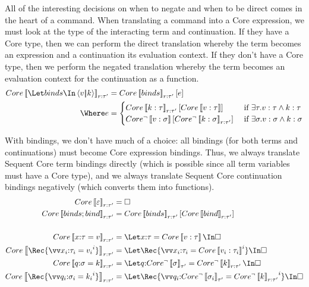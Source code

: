 \documentclass{article}
\begin{document}
All of the interesting decisions on when to negate and when to be direct comes
in the heart of a command.  When translating a command into a Core expression,
we must look at the type of the interacting term and continuation.  If they have
a Core type, then we can perform the direct translation whereby the term becomes
an expression and a continuation its evaluation context.  If they don't have a
Core type, then we perform the negated translation whereby the term becomes an
evaluation context for the continuation as a function.
\begin{align*}
  Core\trans{\Let \binds \In \cut{\tm}{\ko}}_{\ann{r}{\ty'}}
  &= Core\trans{\binds}_{\ann{r}{\ty'}}[\expr]
  \\
  \Where
  e
  &=
  \begin{cases}
    Core\trans{\ko : \ty}_{\ann{r}{\ty'}}[Core\trans{\tm : \ty}]
    & \text{ if } \exists \ty. \tm : \ty \wedge \ko : \ty
    \\
    Core^\neg\trans{\tm : \sty}[Core^\neg\trans{\ko : \sty}_{\ann{r}{\ty'}}]
    & \text{ if } \exists \sty. \tm : \sty \wedge \ko : \sty
  \end{cases}
\end{align*}

With bindings, we don't have much of a choice: all bindings (for both terms and
continuations) must become Core expression bindings.  Thus, we always translate
Sequent Core term bindings directly (which is possible since all term variables
must have a Core type), and we always translate Sequent Core continuation
bindings negatively (which converts them into functions).
\begin{align*}
  Core\trans{\mt}_{\ann{r}{\ty'}} &= \hole
  \\
  Core\trans{\binds; \abind}_{\ann{r}{\ty'}}
  &=
  Core\trans{\binds}_{\ann{r}{\ty'}}[Core\trans{\abind}_{\ann{r}{\ty'}}]
  \\\\
  Core\trans{\ann x \ty = \tm}_{\ann{r}{\ty'}}
  &=
  \Let \ann x \ty = Core\trans{\tm : \ty} \In \hole
  \\
  Core\trans{\Rec \{ \vect[i]{\ann{x_i}{\ty_i} = \tm_i} \}}_{\ann{r}{\ty'}}
  &=
  \Let
    \Rec \{ \vect[i]{\ann{x_i}{\ty_i} = Core\trans{\tm_i : \ty_i}} \}
  \In
    \hole
  \\
  Core\trans{\ann q \sty = \ko}_{\ann{r}{\ty'}}
  &=
  \Let \ann{q}{Core^\neg\trans{\sty}_{\ty'}} = Core^\neg\trans{\ko}_{\ann{r}{\ty'}} \In \hole
  \\
  Core\trans{\Rec \{ \vect[i]{\ann{q_i}{\sty_i} = \ko_i} \}}_{\ann{r}{\ty'}}
  &=
  \Let
    \Rec \{
      \vect[i]{\ann{q_i}{Core^\neg\trans{\sty_i}_{\ty'}}
      =
      Core^\neg\trans{\ko}_{\ann{r}{\ty'}}}
    \}
  \In
    \hole
\end{align*}
\end{document}
